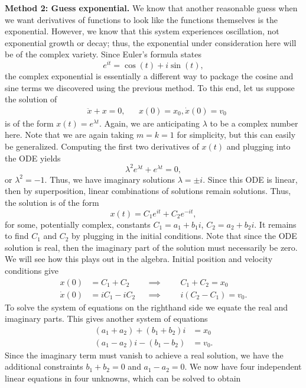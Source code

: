 \documentclass[12pt]{article}
\newcommand{\state}{x}
\begin{document}
\bigskip
\noindent
\textbf{Method 2: Guess exponential.} We know that another reasonable guess when we want derivatives of functions to look like the functions themselves is 
the exponential. However, we know that this system experiences oscillation, not exponential growth or decay; thus, the exponential under consideration here 
will be of the complex variety. Since Euler's formula states
\[
e^{it} = \cos(t) + i \sin(t),
\]
the complex exponential is essentially a different way to package the cosine and sine terms we discovered using the previous method. To this end, let us 
suppose the solution of
\begin{align*}
&\ddot{\state} + \state = 0, && \state(0) = x_0, \dot{\state}(0) = v_0 
\end{align*}
is of the form $\state(t) = e^{\lambda t}$. Again, we are anticipating $\lambda$ to be a complex number here. Note that we are again taking $m = k = 1$ for simplicity, 
but this can easily be generalized. Computing the first two derivatives of $\state(t)$ and plugging into the ODE yields 
\[
\lambda^2 e^{\lambda t} + e^{\lambda t} = 0, 
\]
or $\lambda^2 = -1$. Thus, we have imaginary solutions $\lambda = \pm i$. Since this ODE is linear, then by superposition, linear combinations of solutions remain 
solutions. Thus, the solution is of the form 
\[
\state(t) = C_1 e^{it} + C_2 e^{-it},
\]
for some, potentially complex, constants $C_1 = a_1 + b_1 i$, $C_2 = a_2 + b_2 i$. It remains to find $C_1$ and $C_2$ by plugging in the initial conditions. 
Note that since the ODE solution is real, then the imaginary part of the solution must necessarily be zero. We will see how this plays out in the algebra. 
Initial position and velocity conditions give 
\begin{align*}
\state(0) &= C_1 + C_2 &&\implies &&&C_1 + C_2 = \state_0 \\
\dot{\state}(0) &= i C_1 - i C_2 &&\implies &&&i(C_2 - C_1) = v_0.
\end{align*}
To solve the system of equations on the righthand side we equate the real and imaginary parts. This gives another system of equations 
\begin{align*}
(a_1 + a_2) + (b_1 + b_2)i &= x_0 \\
(a_1 - a_2)i - (b_1 - b_2) &= v_0.
\end{align*}
Since the imaginary term must vanish to achieve a real solution, we have the additional constraints $b_1 + b_2 = 0$ and $a_1 - a_2 = 0$. We now have four independent 
linear equations in four unknowns, which can be solved to obtain 
\end{document}
